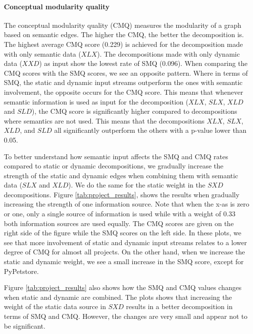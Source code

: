 \paragraph{Conceptual modularity quality}
The conceptual modularity quality (CMQ) measures the modularity of a graph based on semantic edges. The higher the CMQ, the better the decomposition is. The highest average CMQ score (0.229) is achieved for the decomposition made with only semantic data ($XLX$). The decompositions made with only dynamic data ($XXD$) as input show the lowest rate of SMQ (0.096). When comparing the CMQ scores with the SMQ scores, we see an opposite pattern. Where in terms of SMQ, the static and dynamic input streams outperform the ones with semantic involvement, the opposite occurs for the CMQ score. This means that whenever semantic information is used as input for the decomposition ($XLX$, $SLX$, $XLD$ and $SLD$), the CMQ score is significantly higher compared to decompositions where semantics are not used. This means that the decompositions $XLX$, $SLX$, $XLD$, and $SLD$ all significantly outperform the others with a p-value lower than 0.05. \par
To better understand how semantic input affects the SMQ and CMQ rates compared to static or dynamic decompositions, we gradually increase the strength of the static and dynamic edges when combining them with semantic data ($SLX$ and $XLD$). We do the same for the static weight in the $SXD$ decompositions. Figure \ref{tab:project_results}, shows the results when gradually increasing the strength of one information source. Note that when the x-as is zero or one, only a single source of information is used while with a weight of 0.33 both information sources are used equally. 
The CMQ scores are given on the right side of the figure while the SMQ scores on the left side. In these plots, we see that more involvement of static and dynamic input streams relates to a lower degree of CMQ for almost all projects. On the other hand, when we increase the static and dynamic weight, we see a small increase in the SMQ score, except for PyPetstore.  \par
Figure \ref{tab:project_results} also shows how the SMQ and CMQ values changes when static and dynamic are combined. The plots shows that increasing the weight of the static data source in $SXD$ results in a better decomposition in terms of SMQ and CMQ. However, the changes are very small and appear not to be significant.



